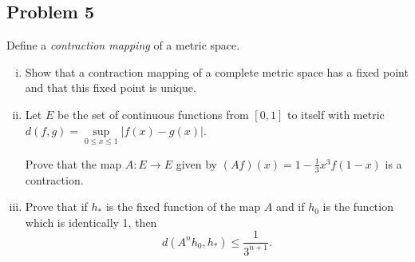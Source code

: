 \documentclass[12pt]{article}
\newcommand{\ita}[1]{\textit{#1}}
\theoremstyle{definition}
\begin{document}
\subsection{Problem 5 \texorpdfstring{\cite{Berge}}{}}
Define a \ita{contraction mapping} of a metric space.
\begin{enumerate}[(i)]
    \item Show that a contraction mapping of a complete metric space has a fixed point and that this fixed point is unique.
    \item Let $E$ be the set of continuous functions from $[0,1]$ to itself with metric $d(f,g) = \sup\limits_{0 \leq x \leq 1} |f(x) - g(x)|$.
    
    Prove that the map $A : E \to E$ given by $(Af)(x) = 1 - \frac{1}{3}x^3f(1-x)$ is a contraction.
    \item Prove that if $h_*$ is the fixed function of the map $A$ and if $h_0$ is the function which is identically 1, then 
    \[
        d(A^nh_0,h_*) \leq \frac{1}{3^{n+1}}.
    \]
\end{enumerate}
\end{document}
